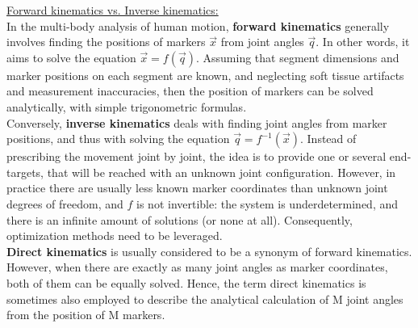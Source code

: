 \noindent\underline{Forward kinematics vs. Inverse kinematics:}\\
In the multi-body analysis of human motion, \textbf{forward kinematics} generally involves finding the positions of markers $\overrightarrow{x}$ from joint angles $\overrightarrow{q}$. In other words, it aims to solve the equation $\overrightarrow{x}=f(\overrightarrow{q})$. Assuming that segment dimensions and marker positions on each segment are known, and neglecting soft tissue artifacts and measurement inaccuracies, then the position of markers can be solved analytically, with simple trigonometric formulas. \\
Conversely, \textbf{inverse kinematics} deals with finding joint angles from marker positions, and thus with solving the equation $\overrightarrow{q}=f^{-1}(\overrightarrow{x})$. Instead of prescribing the movement joint by joint, the idea is to provide one or several end-targets, that will be reached with an unknown joint configuration. However, in practice there are usually less known marker coordinates than unknown joint degrees of freedom, and $f$ is not invertible: the system is underdetermined, and there is an infinite amount of solutions (or none at all). Consequently, optimization methods need to be leveraged.\\
\textbf{Direct kinematics} is usually considered to be a synonym of forward kinematics. However, when there are exactly as many joint angles as marker coordinates, both of them can be equally solved. Hence, the term direct kinematics is sometimes also employed to describe the analytical calculation of M joint angles from the position of M markers.









